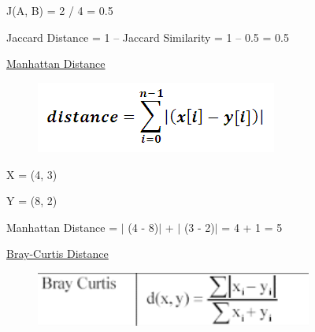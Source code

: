 \documentclass[12pt]{article}
\renewcommand{\_}{\kern-1.5pt\textunderscore\kern-1.5pt}
\begin{document}
{\fontsize{14pt}{16.8pt}\selectfont J(A, B) = 2 / 4 = 0.5\par}\par

{\fontsize{14pt}{16.8pt}\selectfont Jaccard Distance = 1 – Jaccard Similarity = 1 – 0.5 = 0.5\par}\par

{\fontsize{14pt}{16.8pt}\selectfont \uline{Manhattan Distance}\par}\par




\begin{figure}[H]
	\begin{Center}
		\includegraphics[width=3.13in,height=0.92in]{./media/image8.png}
	\end{Center}
\end{figure}



\par

{\fontsize{14pt}{16.8pt}\selectfont X = (4, 3)\par}\par

{\fontsize{14pt}{16.8pt}\selectfont Y = (8, 2)\par}\par

{\fontsize{14pt}{16.8pt}\selectfont Manhattan Distance = $ \vert $ (4 - 8)$ \vert $  + $ \vert $ (3 - 2)$ \vert $  = 4 + 1 = 5\par}\par

{\fontsize{14pt}{16.8pt}\selectfont \uline{Bray-Curtis Distance}\par}\par




\begin{figure}[H]
	\begin{Center}
		\includegraphics[width=3.58in,height=0.7in]{./media/image9.png}
	\end{Center}
\end{figure}
\end{document}
